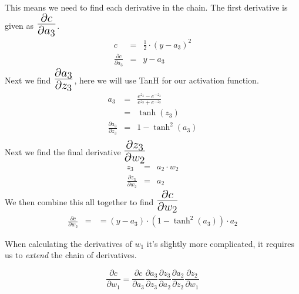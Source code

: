 \begin{flushleft}
                    This means we need to find each derivative in the chain.
                    \vspace{0.2cm}
                    The first derivative is given as $\mathLarge{\frac{\partial c}{\partial a_3}}$. 
                    \begin{eqnarray*}
                        c &=& \frac{1}{2} \cdot (y - a_3)^2 \\
                        \frac{\partial c}{\partial a_3} &=& y - a_3
                    \end{eqnarray*}
                    Next we find $\mathLarge{\frac{\partial a_3}{\partial z_3}}$, here we will use TanH for our activation function.
                    \begin{eqnarray*}
                        a_3 &=& \frac{e^{z_3} - e^{-z_3}}{e^{z_3} + e^{-z_3}} \\
                            &=& \tanh(z_3) \\
                        \frac{\partial a_3}{\partial z_3} &=& 1 - \tanh^{2}(a_3) \\
                    \end{eqnarray*}
                    Next we find the final derivative $\mathLarge{\frac{\partial z_3}{\partial w_2}}$
                    \begin{eqnarray*}
                        z_3 &=& a_2 \cdot w_2 \\
                        \frac{\partial z_3}{\partial w_2} &=& a_2
                    \end{eqnarray*}
                    We then combine this all together to find $\mathLarge{\frac{\partial c}{\partial w_{2}}}$
                    \begin{eqnarray*}
                        \frac{\partial c}{\partial w_{2}} &=& = (y - a_3) \cdot (1 - \tanh^{2}(a_3)) \cdot a_2
                    \end{eqnarray*}

                    \vspace{0.2cm}

                    When calculating the derivatives of $w_1$ it's slightly more complicated, it requires us to \textit{extend}
                    the chain of derivatives.

                    \[\frac{\partial c}{\partial w_1} = \frac{\partial c}{\partial a_3} \frac{\partial a_3}{\partial z_3} \frac{\partial z_3}{\partial a_2} \frac{\partial a_2}{\partial z_2} \frac{\partial z_2}{\partial w_1}\]


\end{flushleft}
